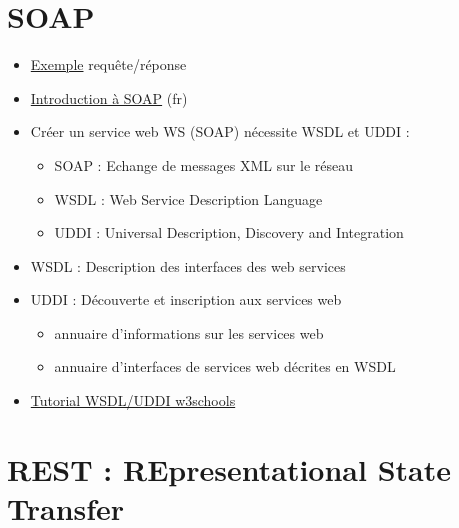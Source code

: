 \hypertarget{soap-2}{%
\section{SOAP}\label{soap-2}}

\begin{itemize}
\tightlist
\item
  \href{http://www.w3schools.com/xml/xml_soap.asp}{Exemple}
  requête/réponse
\item
  \href{http://www.w3big.com/fr/soap/default.html\#gsc.tab=0}{Introduction
  à SOAP} (fr)
\item
  Créer un service web WS (SOAP) nécessite WSDL et UDDI :

  \begin{itemize}
  \tightlist
  \item
    SOAP : Echange de messages XML sur le réseau
  \item
    WSDL : Web Service Description Language
  \item
    UDDI : Universal Description, Discovery and Integration
  \end{itemize}
\item
  WSDL : Description des interfaces des web services
\item
  UDDI : Découverte et inscription aux services web

  \begin{itemize}
  \tightlist
  \item
    annuaire d'informations sur les services web
  \item
    annuaire d'interfaces de services web décrites en WSDL
  \end{itemize}
\item
  \href{http://www.w3schools.com/xml/xml_wsdl.asp}{Tutorial WSDL/UDDI
  w3schools}
\end{itemize}

\hypertarget{rest-representational-state-transfer}{%
\section{REST : REpresentational State
Transfer}\label{rest-representational-state-transfer}}

